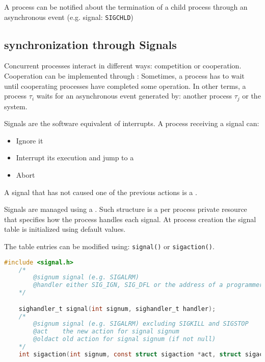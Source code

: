 A process can be notified about the termination of a child process through an asynchronous event (e.g. signal: \texttt{SIGCHLD})

\subsection{synchronization through Signals}
Concurrent processes interact in different ways: competition or cooperation.\\
Cooperation can be implemented through : Sometimes, a process has to wait until cooperating processes have completed some operation. In other terms, a process $\tau_i$ waits for an asynchronous event generated by: another process $\tau_j$ or the system.


Signals are the software equivalent of interrupts. A process receiving a signal can:
\begin{itemize}
    \item Ignore it
    \item Interrupt its execution and jump to a 
    \item Abort
\end{itemize}
A signal that has not caused one of the previous actions is a .

Signals are managed using a . Such structure is a per process private resource that specifies how the process handles each signal. At process creation the signal table is initialized using default values.

The table entries can be modified using: \texttt{signal()} or \texttt{sigaction()}.
\begin{lstlisting}[language=C]
    #include <signal.h>
    /*
        @signum signal (e.g. SIGALRM)
        @handler either SIG_IGN, SIG_DFL or the address of a programmer-defined function
    */

    sighandler_t signal(int signum, sighandler_t handler);
    /*
        @signum signal (e.g. SIGALRM) excluding SIGKILL and SIGSTOP
        @act    the new action for signal signum
        @oldact old action for signal signum (if not null)
    */
    int sigaction(int signum, const struct sigaction *act, struct sigaction *oldact);
\end{lstlisting}

